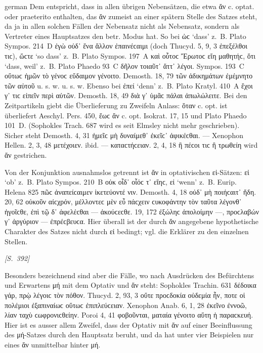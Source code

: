\begin{otherlanguage*}{german}
Dem entspricht, dass in allen übrigen Nebensätzen, die etwa ἄν c. optat. oder praeterito enthalten, das ἄν zumeist an einer spätern Stelle des Satzes steht, da ja in allen solchen Fällen der Nebensatz nicht als Nebensatz, sondern als Vertreter eines Hauptsatzes den betr. Modus hat. So bei ὡϲ ‘dass’ z.~B. Plato Sympos. 214~D  ἐγὼ οὐδ᾽  ἕνα ἄλλον ἐπαινέϲαιμι (doch Thucyd. 5, 9, 3  ἐπεξέλθοι τιϲ), ὥϲτε ‘so dass’ z.~B. Plato Sympos. 197~A  καὶ οὗτοϲ Ἔρωτοϲ  εἴη μαθητήϲ, ὅτι ‘dass, weil’ z.~Β. Plato Phaedo 93~C δῆλον  τοιαῦτ᾽ ἄττ᾽  λέγοι. Sympos. 193~C  οὕτωϲ  ἡμῶν τὸ γένοϲ εὔδαιμον γένοιτο. Demosth. 18, 79  τῶν ἀδικημάτων  ἐμέμνητο τῶν αὑτοῦ u. s. w. u. s. w. Ebenso bei ἐπεί ‘denn’ z.~B. Plato Kratyl. 410~A  ἔχοι γ᾽  τιϲ εἰπεῖν περὶ αὐτῶν. Demosth. 18, 49  διὰ γ᾽ ὑμᾶϲ πάλαι  ἀπωλώλειτε. Bei den Zeitpartikeln giebt die Überlieferung zu Zweifeln Anlass: ὅταν c. opt. ist überliefert Aeschyl. Pers. 450, ἕωϲ ἄν c. opt. Isokrat. 17, 15 und Plato Phaedo 101~D. (Sophokles Trach. 687 wird es seit Elmsley nicht mehr geschrieben). Sicher steht Demosth. 4, 31  ἡμεῖϲ μὴ δυναίμεθ᾽ ἐκεῖϲ᾽ ἀφικέϲθαι. — Xenophon Hellen. 2, 3, 48  μετέχοιεν. ibid.  — καταϲτήϲειαν. 2, 4, 18  ἢ πέϲοι τιϲ ἢ τρωθείη wird ἄν gestrichen.

Von der Konjunktion ausnahmslos getrennt ist ἄν in optativischen εἰ-Sätzen: εἰ ‘ob’ z.~B. Plato Sympos. 210~B οὐκ οἶδ᾽  οἷόϲ τ᾽  εἴηϲ, εἰ ‘wenn’ z.~B. Eurip. Helena 825  πῶϲ  ἀναπείϲαιμεν ἱκετεύοντέ νιν. Demosth. 4, 18 οὐδ᾽  μὴ ποιήϲαιτ᾽  ἤδη. 20, 62 οὐκοῦν αἰϲχρόν,  μέλλοντεϲ μὲν εὖ πάϲχειν ϲυκοφάντην  τὸν ταῦτα λέγονθ᾽ ἡγοῖϲθε, ἐπὶ τῷ δ᾽ ἀφελέϲθαι — ἀκούϲεϲθε. 19, 172 ἐξώληϲ ἀπολοίμην —,  προϲλαβών γ᾽  ἀργύριον — ἐπρέϲβευϲα. Hier überall ist der durch ἄν angegebene hypothetische Charakter des Satzes nicht durch εἰ bedingt; vgl. die Erklärer zu den einzelnen Stellen.

\hypertarget{p392}{\emph{[S.~392]}}\label{p392} Besonders bezeichnend sind aber die Fälle, wo nach Ausdrücken des Befürchtens und Erwartens μή mit dem Optativ und ἄν steht: Sophokles Trachin. 631 δέδοικα γάρ,  πρῲ λέγοιϲ  τὸν πόθον. Thucyd. 2, 93, 3 οὔτε προϲδοκία οὐδεμία ἦν,  ποτε οἱ πολέμιοι ἐξαπιναίωϲ οὕτωϲ ἐπιπλεύϲειαν. Xenophon Anab. 6, 1, 28 ἐκεῖνο ἐννοῶ,  λίαν  ταχὺ ϲωφρονιϲθείην. Poroi 4, 41 φο\-βοῦν\-ται,  ματαία  γένοιτο αὕτη ἡ παραϲκευή. Hier ist es ausser allem Zweifel, dass der Optativ mit ἄν auf einer Beeinflussung des μή-Satzes durch den Hauptsatz beruht, und da hat unter vier Beispielen nur eines ἄν unmittelbar hinter μή.


\end{otherlanguage*}

